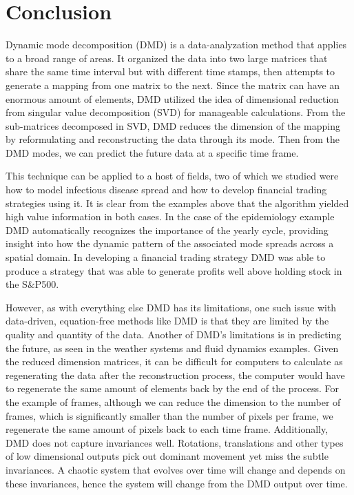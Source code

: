 \documentclass[12pt]{report}
\begin{document}
\chapter{Conclusion}

Dynamic mode decomposition (DMD) is a data-analyzation method that applies to a broad range of areas. It organized the data into two large matrices that share the same time interval but with different time stamps, then attempts to generate a mapping from one matrix to the next. Since the matrix can have an enormous amount of elements, DMD utilized the idea of dimensional reduction from singular value decomposition (SVD) for manageable calculations. From the sub-matrices decomposed in SVD, DMD reduces the dimension of the mapping by reformulating and reconstructing the data through its mode. Then from the DMD modes, we can predict the future data at a specific time frame.

This technique can be applied to a host of fields, two of which we studied were how to model infectious disease spread and how to develop financial trading strategies using it. It is clear from the examples above that the algorithm yielded high value information in both cases. In the case of the epidemiology example DMD automatically recognizes the importance of the yearly cycle, providing insight into how the dynamic pattern of the associated mode spreads across a spatial domain. In developing a financial trading strategy DMD was able to produce a strategy that was able to generate profits well above holding stock in the S$\&$P500. 

However, as with everything else DMD has its limitations, one such issue with data-driven, equation-free methods like DMD is that they are limited by the quality and quantity of the data. Another of DMD's limitations is in predicting the future, as seen in the weather systems and fluid dynamics examples. Given the reduced dimension matrices, it can be difficult for computers to calculate as regenerating the data after the reconstruction process, the computer would have to regenerate the same amount of elements back by the end of the process. For the example of frames, although we can reduce the dimension to the number of frames, which is significantly smaller than the number of pixels per frame, we regenerate the same amount of pixels back to each time frame. Additionally, DMD does not capture invariances well. Rotations, translations and other types of low dimensional outputs pick out dominant movement yet miss the subtle invariances. A chaotic system that evolves over time will change and depends on these invariances, hence the system will change from the DMD output over time. 
\end{document}
